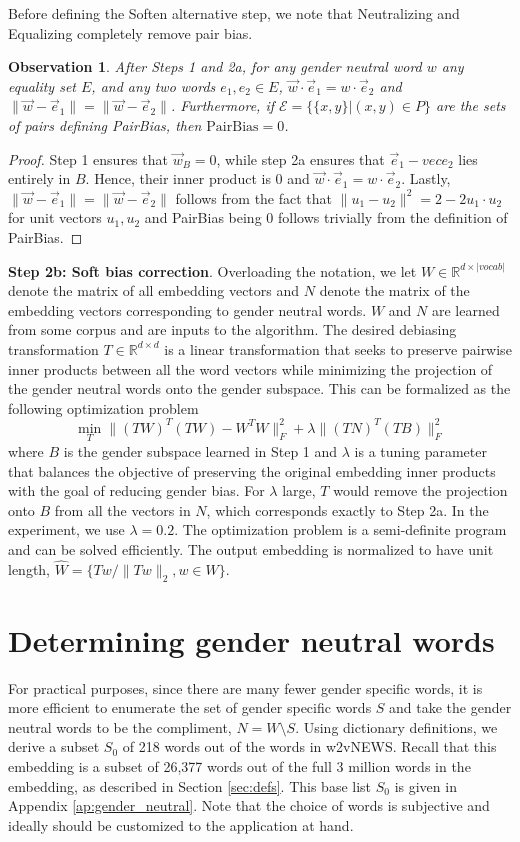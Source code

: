 \documentclass{article}
\newtheorem{observation}{Observation}
\begin{document}
Before defining the Soften alternative step, we note that Neutralizing and Equalizing completely remove pair bias.
\begin{observation}
After Steps 1 and 2a, for any gender neutral word $w$ any equality set $E$, and any two words $e_1, e_2 \in E$, $\vec{w} \cdot \vec{e}_1 = w \cdot \vec{e}_2$ and $\|\vec{w}-\vec{e}_1\| = \|\vec{w}-\vec{e}_2\|$. Furthermore, if $\mathcal{E}=\bigl\{\{x,y\}|(x,y)\in P\bigr\}$ are the sets of pairs defining PairBias, then $\mathrm{PairBias}=0$.
\end{observation}
\begin{proof}
Step 1 ensures that $\vec{w}_B=0$, while step 2a ensures that $\vec{e}_1 - vec{e}_2$ lies entirely in $B$. Hence, their inner product is 0 and 
$\vec{w} \cdot \vec{e}_1 = w \cdot \vec{e}_2$. Lastly, $\|\vec{w}-\vec{e}_1\| = \|\vec{w}-\vec{e}_2\|$ follows from the fact that $\|u_1-u_2\|^2 = 2-2u_1\cdot u_2$ for unit vectors $u_1, u_2$ and PairBias being 0 follows trivially from the definition of PairBias.
\end{proof}


{\bf Step 2b: Soft bias correction}.
Overloading the notation, we let $W \in \mathbb{R}^{d \times |vocab|}$ denote the matrix of all embedding vectors and $N$ denote the matrix of the embedding vectors corresponding to gender neutral words. $W$ and $N$ are learned from some corpus and are inputs to the algorithm. The desired debiasing transformation $T \in \mathbb{R}^{d \times d}$ is a linear transformation that seeks to preserve pairwise inner products between all the word vectors while minimizing the projection of the gender neutral words onto the gender subspace. This can be formalized as the following optimization problem
\[
\min_T  \| (TW)^T(TW)-W^T W \|_F^2 + \lambda \|(TN)^T(TB)\|_F^2
\]
where $B$ is the gender subspace learned in Step 1 and $\lambda$ is a tuning parameter that balances the objective of preserving the original embedding inner products with the goal of reducing gender bias. For $\lambda$ large, $T$ would remove the projection onto $B$ from all the vectors in $N$, which corresponds exactly to Step 2a. In the experiment, we use $\lambda=0.2$. The optimization problem is a semi-definite program and can be solved efficiently. The output embedding is normalized to have unit length, $\hat{W} = \{Tw/\|Tw\|_2, w \in W\}$. 



\section{Determining gender neutral words}\label{sec:gender_neutral}
For practical purposes, since there are many fewer gender specific words, it is more efficient to enumerate the set of gender specific words $S$ and take the gender neutral words to be the compliment, $N=W\setminus S$. Using dictionary definitions, we derive a subset $S_0$ of 218 words out of the words in w2vNEWS. Recall that this embedding is a subset of 26,377 words out of the full 3 million words in the embedding, as described in Section \ref{sec:defs}. This base list $S_0$ is given in Appendix \ref{ap:gender_neutral}. Note that the choice of words is subjective and ideally should be customized to the application at hand. 
\end{document}
